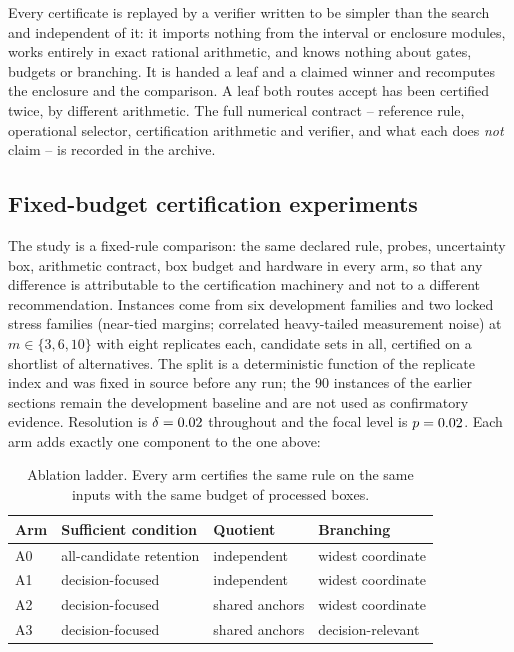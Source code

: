 Every certificate is replayed by a verifier written to be simpler than the
search and independent of it: it imports nothing from the interval or
enclosure modules, works entirely in exact rational arithmetic, and knows
nothing about gates, budgets or branching. It is handed a leaf and a claimed
winner and recomputes the enclosure and the comparison. A leaf both routes
accept has been certified twice, by different arithmetic. The full numerical
contract -- reference rule, operational selector, certification arithmetic and
verifier, and what each does \emph{not} claim -- is recorded in the archive.

\subsection{Fixed-budget certification experiments}
\label{sec:certrelex-experiments}
The study is a fixed-rule comparison: the same declared rule, probes,
uncertainty box, arithmetic contract, box budget and hardware in every arm, so
that any difference is attributable to the certification machinery and not to a
different recommendation. Instances come from six development families and two
locked stress families (near-tied margins; correlated heavy-tailed measurement
noise) at $m\in\{3,6,10\}$ with eight replicates each,
\crxInstances{} candidate sets in all, certified on a shortlist of
\crxShortlist{} alternatives. The split is a deterministic function of the
replicate index and was fixed in source before any run; the 90 instances of the
earlier sections remain the development baseline and are not used as
confirmatory evidence. Resolution is $\delta=0.02$ throughout and the
focal level is $p=0.02$. Each arm adds exactly one component to the
one above:

\begin{table}[tbp]\centering\small
\caption{Ablation ladder. Every arm certifies the same rule on the same inputs with the same budget of \crxBudget{} processed boxes.}
\label{tab:crxarms}
\begin{tabular}{@{}llll@{}}\toprule
Arm & Sufficient condition & Quotient & Branching\\\midrule
A0 & all-candidate retention & independent & widest coordinate\\
A1 & decision-focused & independent & widest coordinate\\
A2 & decision-focused & shared anchors & widest coordinate\\
A3 & decision-focused & shared anchors & decision-relevant\\\bottomrule
\end{tabular}
\end{table}

